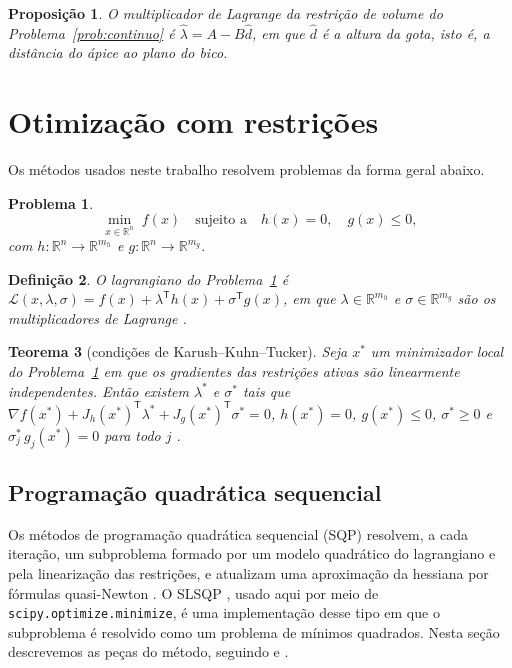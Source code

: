 \documentclass[12pt, oneside, a4paper, english, brazil]{abntex2}
\theoremstyle{relatorio}
\newtheorem{definicao}{Definição}[section]
\theoremstyle{relatorioit}
\newtheorem{teorema}[definicao]{Teorema}
\newtheorem{proposicao}[definicao]{Proposição}
\theoremstyle{problema}
\newtheorem{problema}{Problema}[section]
\newcommand{\code}[1]{{\renewcommand{\_}{\textunderscore\allowbreak}\texttt{#1}}}
\newcommand{\dhat}{\hat d}
\newcommand{\lh}{\hat\lambda}
\begin{document}
\begin{proposicao}
O multiplicador de Lagrange da restrição de volume do Problema~\ref{prob:continuo} é
$\lh = A - B\dhat$, em que $\dhat$ é a altura da gota, isto é, a distância do ápice ao plano
do bico.
\label{prop:multiplicador}
\end{proposicao}

\section{Otimização com restrições}

Os métodos usados neste trabalho resolvem problemas da forma geral abaixo.

\begin{problema}
\begin{equation}
  \min_{x \in \mathbb{R}^n} \; f(x) \quad \text{sujeito a} \quad
  h(x) = 0, \quad g(x) \le 0,
  \label{eq:problema-geral}
\end{equation}
com $h\colon \mathbb{R}^n \to \mathbb{R}^{m_h}$ e $g\colon \mathbb{R}^n \to \mathbb{R}^{m_g}$.
\label{prob:geral}
\end{problema}

\begin{definicao}
O lagrangiano do Problema~\ref{prob:geral} é
$\mathcal{L}(x, \lambda, \sigma) = f(x) + \lambda^{\mathsf T} h(x) + \sigma^{\mathsf T} g(x)$,
em que $\lambda \in \mathbb{R}^{m_h}$ e $\sigma \in \mathbb{R}^{m_g}$ são os multiplicadores
de Lagrange \parencite{martins2021}.
\end{definicao}

\begin{teorema}[condições de Karush--Kuhn--Tucker]
Seja $x^*$ um minimizador local do Problema~\ref{prob:geral} em que os gradientes das
restrições ativas são linearmente independentes. Então existem $\lambda^*$ e $\sigma^*$
tais que $\nabla f(x^*) + J_h(x^*)^{\mathsf T} \lambda^* + J_g(x^*)^{\mathsf T}\sigma^* = 0$,
$h(x^*) = 0$, $g(x^*) \le 0$, $\sigma^* \ge 0$ e $\sigma_j^*\, g_j(x^*) = 0$ para todo
$j$ \parencite[cap.~12]{nocedal2006}.
\end{teorema}

\subsection{Programação quadrática sequencial}
\label{sec:sqp}

Os métodos de programação quadrática sequencial (SQP) resolvem, a cada iteração, um
subproblema formado por um modelo quadrático do lagrangiano e pela linearização das
restrições, e atualizam uma aproximação da hessiana por fórmulas quasi-Newton
\parencite{nocedal2006, martins2021}. O SLSQP \parencite{kraft1988}, usado aqui por meio
de \code{scipy.optimize.minimize}, é uma implementação desse tipo em que o subproblema
é resolvido como um problema de mínimos quadrados. Nesta seção descrevemos as peças
do método, seguindo \textcite[cap.~18]{nocedal2006} e \textcite{kraft1988}.
\end{document}
